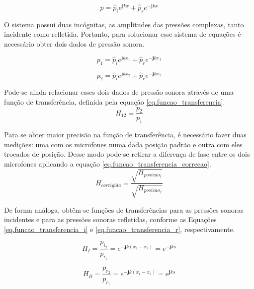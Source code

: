 \begin{equation}
p= \widehat{p}_{i}e^{\textbf{j}kx} + \widehat{p}_{r}e^{-\textbf{j}kx}
\end{equation}

O sistema possui duas incógnitas, as amplitudes das pressões complexas, tanto incidente como refletida. Portanto, para solucionar esse sistema de equações é necessário obter dois dados de pressão sonora.

\begin{equation}
p_{1}= \widehat{p}_{i}e^{\textbf{j}kx_{1}} + \widehat{p}_{r}e^{-\textbf{j}kx_{1}}
\end{equation}

\begin{equation}
p_{2}= \widehat{p}_{i}e^{\textbf{j}kx_{2}} + \widehat{p}_{r}e^{-\textbf{j}kx_{2}}
\end{equation}

Pode-se ainda relacionar esses dois dados de pressão sonora através de uma função de transferência, definida pela equação \ref{eq.funcao_transferencia}.
\begin{equation}
H_{12}=\frac{p_{2}}{p_{1}}
\label{eq.funcao_transferencia}
\end{equation}

Para se obter maior precisão na função de transferência, é necessário fazer duas medições: uma com os microfones numa dada posição padrão e outra com eles trocados de posição. Desse modo pode-se retirar a diferença de fase entre os dois microfones aplicando a equação \ref{eq.funcao_transferencia_correcao}.
\begin{equation}
	H_{corrigida} = \frac{\sqrt{H_{posicao_1}}}{\sqrt{H_{posicao_2}}}
\label{eq.funcao_transferencia_correcao}
\end{equation} 

De forma análoga, obtêm-se funções de transferências para as pressões sonoras incidentes e para as pressões sonoras refletidas, conforme as Equações \ref{eq.funcao_transferencia_i} e \ref{eq.funcao_transferencia_r}, respectivamente.

\begin{equation}
H_{I} = \frac{p_{i_{2}}}{p_{i_{1}}}=e^{-\textbf{j}k(x_{1}-x_{2})}=e^{-\textbf{j}ks}
\label{eq.funcao_transferencia_i}
\end{equation} 

\begin{equation}
H_{R} = \frac{p_{r_{2}}}{p_{r_{1}}}=e^{-\textbf{j}k(x_{1}-x_{2})}=e^{\textbf{j}ks}
\label{eq.funcao_transferencia_r}
\end{equation}

